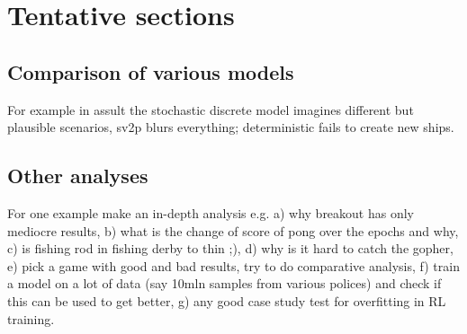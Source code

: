 \documentclass[12pt]{article}
\begin{document}
\section{Tentative sections}
\subsection{Comparison of various models}
For example in assult the stochastic discrete model imagines different but plausible scenarios, sv2p blurs everything; deterministic fails to create new ships.

\subsection{Other analyses}
For one example make an in-depth analysis e.g. a) why breakout has only mediocre results, b) what is the change of score of pong over the epochs and why, c) is fishing rod in fishing derby to thin ;), d) why is it hard to catch the gopher, e) pick a game with good and bad results, try to do comparative analysis, f) train a model on a lot of data (say 10mln samples from various polices) and check if this can be used to get better, g) any good case study test for overfitting in RL training.
\newpage 


\end{document}

